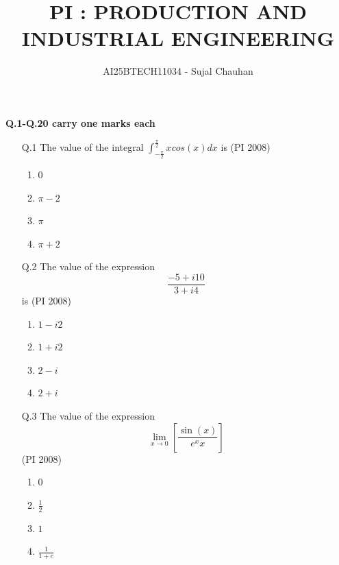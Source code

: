 \documentclass[journal,12pt,onecolumn]{IEEEtran}
\theoremstyle{remark}
\begin{document}
\title{PI : PRODUCTION AND INDUSTRIAL ENGINEERING}
\author{AI25BTECH11034 - Sujal Chauhan}
\maketitle
\renewcommand{\thefigure}{\theenumi}
\renewcommand{\thetable}{\theenumi}
\textbf{Q.1-Q.20 carry one marks each}
\vspace{1cm}

\begin{enumerate}

    

    \item[\textnormal{Q.1}]  The value of the integral $\int_{-\frac{\pi}{2}}^{\frac{\pi}{2}}xcos(x)dx$ is 
    \hfill{(PI 2008)}
    \begin{multicols}{4}
    \begin{enumerate}[label=(\Alph*)]
        \item $0$
        \item $\pi-2$
        \item $\pi$
        \item $\pi+2$
    \end{enumerate}
\end{multicols}
\vspace{1cm}
\item[\textnormal{Q.2}]  The value of the expression $$\frac{-5+i10}{3+i4}$$ is 
    \hfill{(PI 2008)}
    \begin{multicols}{4}
    \begin{enumerate}[label=(\Alph*)]
        \item $1-i2$
        \item $1+i2$
        \item $2-i$
        \item $2+i$
    \end{enumerate}
\end{multicols}
\vspace{1cm}
\item[\textnormal{Q.3}] The value of the expression $$\lim_{x\to0}\left[\frac{\sin(x)}{e^xx}\right]$$  
    \hfill{(PI 2008)}
    \begin{multicols}{4}
    \begin{enumerate}[label=(\Alph*)]
        \item $0$
        \item $\frac{1}{2}$
        \item $1$
        \item $\frac{1}{1+e}$
    \end{enumerate}

\end{multicols}
\end{enumerate}
\end{document}
